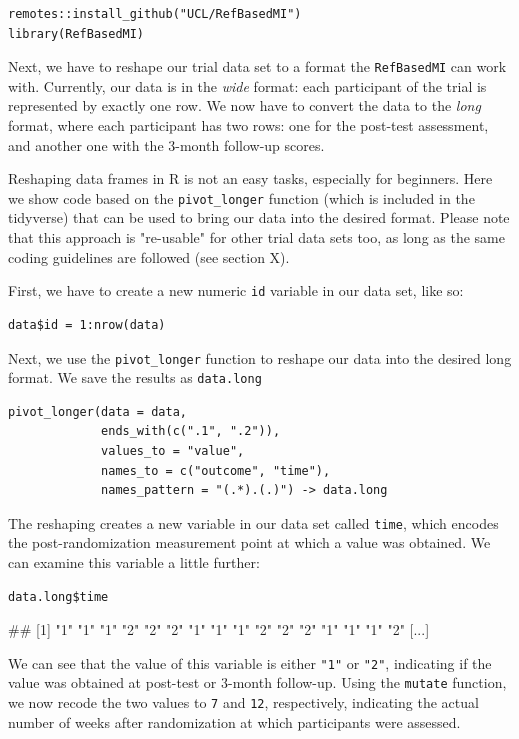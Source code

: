 \begin{lstlisting}
remotes::install_github("UCL/RefBasedMI")
library(RefBasedMI)
\end{lstlisting}

Next, we have to reshape our trial data set to a format the \texttt{RefBasedMI} can work with. Currently, our data is in the \emph{wide} format: each participant of the trial is represented by exactly one row. We now have to convert the data to the \emph{long} format, where each participant has two rows: one for the post-test assessment, and another one with the 3-month follow-up scores.

Reshaping data frames in \textsf{R} is not an easy tasks, especially for beginners. Here we show code based on the \texttt{pivot\_longer} function (which is included in the tidyverse) that can be used to bring our data into the desired format. Please note that this approach is "re-usable" for other trial data sets too, as long as the same coding guidelines are followed (see section X).

First, we have to create a new numeric \texttt{id} variable in our data set, like so:

\begin{lstlisting}
data$id = 1:nrow(data)
\end{lstlisting}

Next, we use the \texttt{pivot\_longer} function to reshape our data into the desired long format. We save the results as \texttt{data.long}

\begin{lstlisting}
pivot_longer(data = data, 
             ends_with(c(".1", ".2")),
             values_to = "value",
             names_to = c("outcome", "time"),
             names_pattern = "(.*).(.)") -> data.long
\end{lstlisting}

The reshaping creates a new variable in our data set called \texttt{time}, which encodes the post-randomization measurement point at which a value was obtained. We can examine this variable a little further:

\begin{lstlisting}
data.long$time
\end{lstlisting}

\begin{example}
##  [1] "1" "1" "1" "2" "2" "2" "1" "1" "1" "2" "2" "2" "1" "1" "1" "2" [...]
\end{example}

We can see that the value of this variable is either \texttt{"1"} or \texttt{"2"}, indicating if the value was obtained at post-test or 3-month follow-up. Using the \texttt{mutate} function, we now recode the two values to \texttt{7} and \texttt{12}, respectively, indicating the actual number of weeks after randomization at which participants were assessed.

